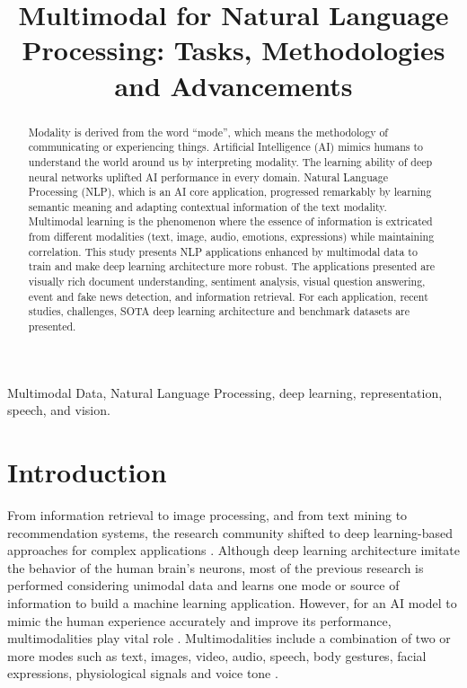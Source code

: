\documentclass[conference]{IEEEtran}
\begin{document}
\title{Multimodal for Natural Language Processing: Tasks, Methodologies and Advancements\\
}

\author{
\and
{}
}

\maketitle

\begin{abstract}
Modality is derived from the word “mode”, which means the methodology of communicating or experiencing things. Artificial Intelligence (AI) mimics humans to understand the world around us by interpreting modality. The learning ability of deep neural networks uplifted AI performance in every domain. Natural Language Processing (NLP), which is an AI core application, progressed remarkably by learning semantic meaning and adapting contextual information of the text modality. Multimodal learning is the phenomenon where the essence of information is extricated from different modalities (text, image, audio, emotions, expressions) while maintaining correlation. This study presents NLP applications enhanced by multimodal data to train and make deep learning architecture more robust. The applications presented are visually rich document understanding, sentiment analysis, visual question answering, event and fake news detection, and information retrieval. For each application, recent studies, challenges,  SOTA deep learning architecture and benchmark datasets are presented.           
\end{abstract}
\begin{IEEEkeywords}
Multimodal Data, Natural Language Processing, deep learning, representation, speech, and vision. 

\end{IEEEkeywords}


\section{Introduction}
  From information retrieval to image processing, and from text mining to recommendation systems, the research community shifted to deep learning-based approaches for complex applications \cite{guo2019deep}. Although deep learning architecture imitate the behavior of the human brain's neurons, most of the previous research is performed considering unimodal data and learns one mode or source of information to build a machine learning application. However, for an AI model to mimic the human experience accurately and improve its performance, multimodalities play vital role \cite{wignell2021natural}. Multimodalities include a combination of two or more modes such as text, images, video, audio, speech, body gestures, facial expressions, physiological signals and voice tone \cite{recent_paper}.
 
\end{document}
